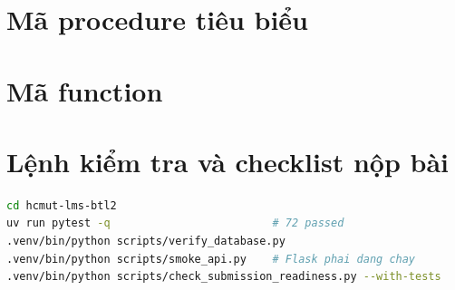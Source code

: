 \documentclass[a4paper,13pt]{extarticle}
\providecommand{\Tbl}[1]{\texttt{\detokenize{#1}}}
\begin{document}




\section{Mã procedure tiêu biểu}
\label{app:procedures}





\section{Mã function}
\label{app:functions}





\section{Lệnh kiểm tra và checklist nộp bài}
\label{app:checklist}

\begin{lstlisting}[style=sqlstyle,language=bash,caption={Chạy lại toàn bộ kiểm thử},label={lst:final-check}]
cd hcmut-lms-btl2
uv run pytest -q                         # 72 passed
.venv/bin/python scripts/verify_database.py
.venv/bin/python scripts/smoke_api.py    # Flask phai dang chay
.venv/bin/python scripts/check_submission_readiness.py --with-tests
\end{lstlisting}
\end{document}
